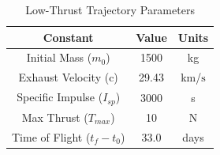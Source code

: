 \documentclass[letterpaper, submit]{AAS}			%
\begin{document}
%
\begin{table}[hbt!]
	\centering
	\caption{Low-Thrust Trajectory Parameters}
	\label{tab:traj_params}
	\begin{tabular}{ccc}
		\hline
		\hline
		Constant             		 & Value        & Units         \\ 
		\hline
		Initial Mass ($m_0$) 		 & 1500 		& kg            \\
		Exhaust Velocity (c) 		 & 29.43        & km/$\text{s}$  \\
		Specific Impulse ($I_{sp}$)  & 3000  		& s             \\
		Max Thrust ($T_{max}$)       & 10  		 	& N             \\
		Time of Flight ($t_f-t_0$)   & 33.0      	& days          \\
		\hline \hline
	\end{tabular}
\end{table}
\end{document}
